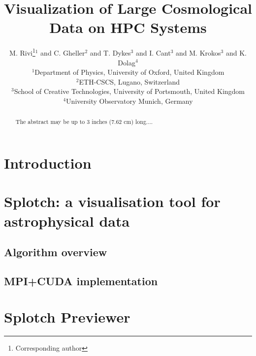 \documentclass{egpubl}
\title[Visualization of Large Cosmological Data on HPC Systems]%
      {Visualization of Large Cosmological Data on HPC Systems}
\author[M. Rivi \& C. Gheller \& T. Dykes \& I. Cant \& M. Krokos \& K. Dolag]
       {M. Rivi\thanks{Corresponding author}$^{1}$
        and C. Gheller$^{2}$ and T. Dykes$^{3}$ and I. Cant$^3$ and M. Krokos$^{3}$ and K. Dolag$^{4}$
        \\
         $^1$Department of Physics, University of Oxford, United Kingdom\\
         $^2$ETH-CSCS, Lugano, Switzerland\\
         $^3$School of Creative Technologies, University of Portsmouth, United Kingdom\\
         $^4$University Observatory Munich, Germany
       }
\begin{document}

\maketitle

\begin{abstract}
   The abstract may be up to 3 inches (7.62 cm) long.... 

\begin{classification} %
\end{classification}

\end{abstract}

 
\section{Introduction}

\section{Splotch: a visualisation tool for astrophysical data}
\cite{DRGI08}

\subsection{Algorithm overview }

\subsection{MPI+CUDA implementation}
\cite{JKR*10}
\cite{RGD*14}
\section{Splotch Previewer}
\end{document}
